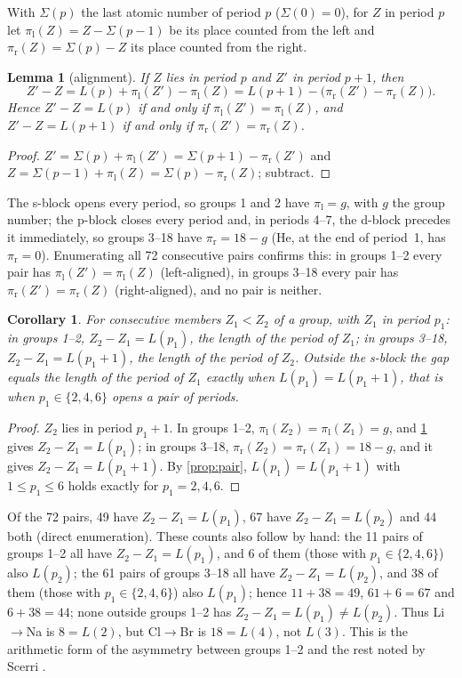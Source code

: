 \documentclass[11pt]{article}
\newtheorem{lemma}[theorem]{Lemma}
\newtheorem{corollary}[theorem]{Corollary}
\theoremstyle{definition}\newtheorem{definition}[theorem]{Definition}
\theoremstyle{remark}\newtheorem{remark}[theorem]{Remark}
\begin{document}
With $\Sigma(p)$ the last atomic number of period $p$ ($\Sigma(0)=0$), for $Z$ in period $p$ let $\pi_{\mathrm l}(Z)=Z-\Sigma(p-1)$ be its place counted from the left and $\pi_{\mathrm r}(Z)=\Sigma(p)-Z$ its place counted from the right.

\begin{lemma}[alignment]\label{lem:align}
If $Z$ lies in period $p$ and $Z'$ in period $p+1$, then
\[
Z'-Z=L(p)+\pi_{\mathrm l}(Z')-\pi_{\mathrm l}(Z)=L(p+1)-\bigl(\pi_{\mathrm r}(Z')-\pi_{\mathrm r}(Z)\bigr).
\]
Hence $Z'-Z=L(p)$ if and only if $\pi_{\mathrm l}(Z')=\pi_{\mathrm l}(Z)$, and $Z'-Z=L(p+1)$ if and only if $\pi_{\mathrm r}(Z')=\pi_{\mathrm r}(Z)$.
\end{lemma}
\begin{proof}
$Z'=\Sigma(p)+\pi_{\mathrm l}(Z')=\Sigma(p+1)-\pi_{\mathrm r}(Z')$ and $Z=\Sigma(p-1)+\pi_{\mathrm l}(Z)=\Sigma(p)-\pi_{\mathrm r}(Z)$; subtract.
\end{proof}

The s-block opens every period, so groups 1 and 2 have $\pi_{\mathrm l}=g$, with $g$ the group number; the p-block closes every period and, in periods 4--7, the d-block precedes it immediately, so groups 3--18 have $\pi_{\mathrm r}=18-g$ (He, at the end of period~1, has $\pi_{\mathrm r}=0$). Enumerating all 72 consecutive pairs confirms this: in groups 1--2 every pair has $\pi_{\mathrm l}(Z')=\pi_{\mathrm l}(Z)$ (left-aligned), in groups 3--18 every pair has $\pi_{\mathrm r}(Z')=\pi_{\mathrm r}(Z)$ (right-aligned), and no pair is neither.

\begin{corollary}\label{cor:gap}
For consecutive members $Z_1<Z_2$ of a group, with $Z_1$ in period $p_1$: in groups 1--2, $Z_2-Z_1=L(p_1)$, the length of the period of $Z_1$; in groups 3--18, $Z_2-Z_1=L(p_1+1)$, the length of the period of $Z_2$. Outside the s-block the gap equals the length of the period of $Z_1$ exactly when $L(p_1)=L(p_1+1)$, that is when $p_1\in\{2,4,6\}$ opens a pair of periods.
\end{corollary}
\begin{proof}
$Z_2$ lies in period $p_1+1$. In groups 1--2, $\pi_{\mathrm l}(Z_2)=\pi_{\mathrm l}(Z_1)=g$, and \cref{lem:align} gives $Z_2-Z_1=L(p_1)$; in groups 3--18, $\pi_{\mathrm r}(Z_2)=\pi_{\mathrm r}(Z_1)=18-g$, and it gives $Z_2-Z_1=L(p_1+1)$. By \cref{prop:pair}, $L(p_1)=L(p_1+1)$ with $1\le p_1\le6$ holds exactly for $p_1=2,4,6$.
\end{proof}
Of the 72 pairs, 49 have $Z_2-Z_1=L(p_1)$, 67 have $Z_2-Z_1=L(p_2)$ and 44 both (direct enumeration). These counts also follow by hand: the 11 pairs of groups 1--2 all have $Z_2-Z_1=L(p_1)$, and 6 of them (those with $p_1\in\{2,4,6\}$) also $L(p_2)$; the 61 pairs of groups 3--18 all have $Z_2-Z_1=L(p_2)$, and 38 of them (those with $p_1\in\{2,4,6\}$) also $L(p_1)$; hence $11+38=49$, $61+6=67$ and $6+38=44$; none outside groups 1--2 has $Z_2-Z_1=L(p_1)\ne L(p_2)$. Thus Li$\to$Na is $8=L(2)$, but Cl$\to$Br is $18=L(4)$, not $L(3)$. This is the arithmetic form of the asymmetry between groups 1--2 and the rest noted by Scerri \cite{Scerri2010}.
\end{document}
